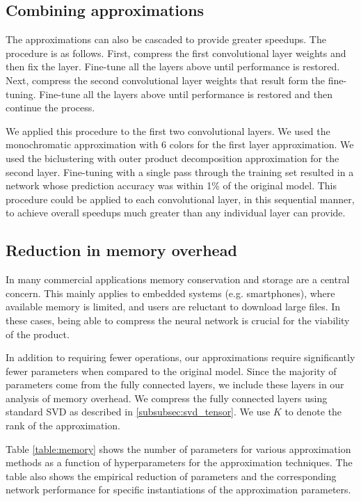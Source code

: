 \subsection{Combining approximations}
The approximations can also be cascaded to provide greater speedups.
The procedure is as follows. 
First, compress the first convolutional layer weights and then fix the layer. 
Fine-tune all the layers above until performance is restored. 
Next, compress the second convolutional layer weights that result form the fine-tuning.
Fine-tune all the layers above until performance is restored and then continue the process. 

We applied this procedure to the first two convolutional layers. 
We used the monochromatic approximation with 6 colors for the first layer approximation. 
We used the biclustering with outer product decomposition approximation for the second layer. 
Fine-tuning with a single pass through the training set resulted in a network whose prediction accuracy was within 1\% of the original model.
This procedure could be applied to each convolutional layer, in this sequential manner, to achieve overall speedups much greater than any individual layer can provide. 

\subsection{Reduction in memory overhead}
In many commercial applications memory conservation and storage are a
central concern. This mainly applies to embedded systems
(e.g. smartphones), where available memory is limited, and users are
reluctant to download large files. In these cases, being able to
compress the neural network is crucial for the viability of the
product. 

In addition to requiring fewer operations, our approximations
require significantly fewer parameters when compared to the original
model. 
Since the majority of parameters come from the fully connected layers, we include these layers in our analysis of memory overhead. We compress the fully connected layers using standard SVD as described in \ref{subsubsec:svd_tensor}. We use $K$ to denote the rank of the approximation.
 
Table \ref{table:memory} shows the number of parameters for
various approximation methods as a function of hyperparameters for the approximation techniques.
The table also shows the empirical reduction of parameters and the corresponding network performance for specific instantiations of the approximation parameters.

